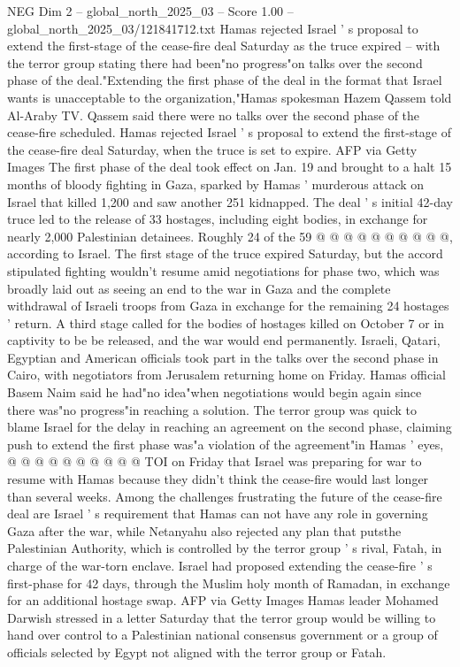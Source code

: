 \begin{textsample}{NEG Dim 2 – global\_north\_2025\_03 – Score 1.00 – global\_north\_2025\_03/121841712.txt}  \label{ex:f2_neg_041}
Hamas rejected Israel ' s proposal to extend the first-stage of the cease-fire deal Saturday as the truce expired -- with the terror group stating there had been"no progress"on talks over the second phase of the deal."Extending the first phase of the deal in the format that Israel wants is unacceptable to the organization,"Hamas spokesman Hazem Qassem told Al-Araby TV.
Qassem said there were no talks over the second phase of the cease-fire scheduled.
Hamas rejected Israel ' s proposal to extend the first-stage of the cease-fire deal Saturday, when the truce is set to expire.
AFP via Getty Images The first phase of the deal took effect on Jan. 19 and brought to a halt 15 months of bloody fighting in Gaza, sparked by Hamas ' murderous attack on Israel that killed 1,200 and saw another 251 kidnapped.
The deal ' s initial 42-day truce led to the release of 33 hostages, including eight bodies, in exchange for nearly 2,000 Palestinian detainees.
Roughly 24 of the 59 @ @ @ @ @ @ @ @ @ @, according to Israel.
The first stage of the truce expired Saturday, but the accord stipulated fighting wouldn't resume amid negotiations for phase two, which was broadly laid out as seeing an end to the war in Gaza and the complete withdrawal of Israeli troops from Gaza in exchange for the remaining 24 hostages ' return.
A third stage called for the bodies of hostages killed on October 7 or in captivity to be be released, and the war would end permanently.
Israeli, Qatari, Egyptian and American officials took part in the talks over the second phase in Cairo, with negotiators from Jerusalem returning home on Friday.
Hamas official Basem Naim said he had"no idea"when negotiations would begin again since there was"no progress"in reaching a solution.
The terror group was quick to blame Israel for the delay in reaching an agreement on the second phase, claiming push to extend the first phase was"a violation of the agreement"in Hamas ' eyes, @ @ @ @ @ @ @ @ @ @ TOI on Friday that Israel was preparing for war to resume with Hamas because they didn't think the cease-fire would last longer than several weeks.
Among the challenges frustrating the future of the cease-fire deal are Israel ' s requirement that Hamas can not have any role in governing Gaza after the war, while Netanyahu also rejected any plan that putsthe Palestinian Authority, which is controlled by the terror group ' s rival, Fatah, in charge of the war-torn enclave.
Israel had proposed extending the cease-fire ' s first-phase for 42 days, through the Muslim holy month of Ramadan, in exchange for an additional hostage swap.
AFP via Getty Images Hamas leader Mohamed Darwish stressed in a letter Saturday that the terror group would be willing to hand over control to a Palestinian national consensus government or a group of officials selected by Egypt not aligned with the terror group or Fatah.

\end{textsample}
